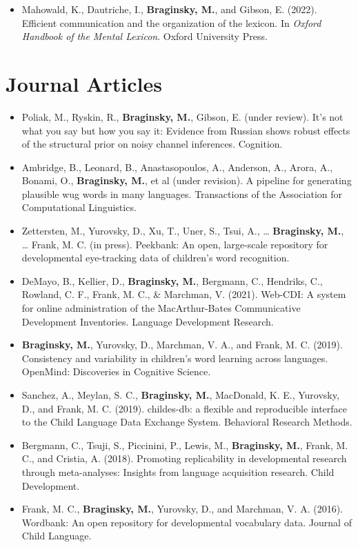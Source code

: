 \documentclass[11pt,]{article}
\providecommand{\tightlist}{%
  \setlength{\itemsep}{0pt}\setlength{\parskip}{0pt}}
\begin{document}
\begin{itemize}
\tightlist
\item
  Mahowald, K., Dautriche, I., \textbf{Braginsky, M.}, and Gibson, E.
  (2022). Efficient communication and the organization of the lexicon.
  In \emph{Oxford Handbook of the Mental Lexicon}. Oxford University
  Press.
\end{itemize}

\hypertarget{journal-articles}{%
\section{Journal Articles}\label{journal-articles}}

\begin{itemize}
\item
  Poliak, M., Ryskin, R., \textbf{Braginsky, M.}, Gibson, E. (under
  review). It's not what you say but how you say it: Evidence from
  Russian shows robust effects of the structural prior on noisy channel
  inferences. Cognition.
\item
  Ambridge, B., Leonard, B., Anastasopoulos, A., Anderson, A., Arora,
  A., Bonami, O., \textbf{Braginsky, M.}, et al (under revision). A
  pipeline for generating plausible wug words in many languages.
  Transactions of the Association for Computational Linguistics.
\item
  Zettersten, M., Yurovsky, D., Xu, T., Uner, S., Tsui, A., \ldots{}
  \textbf{Braginsky, M.}, \ldots{} Frank, M. C. (in press). Peekbank: An
  open, large-scale repository for developmental eye-tracking data of
  children's word recognition.
\item
  DeMayo, B., Kellier, D., \textbf{Braginsky, M.}, Bergmann, C.,
  Hendriks, C., Rowland, C. F., Frank, M. C., \& Marchman, V. (2021).
  Web-CDI: A system for online administration of the MacArthur-Bates
  Communicative Development Inventories. Language Development Research.
\item
  \textbf{Braginsky, M.}, Yurovsky, D., Marchman, V. A., and Frank, M.
  C. (2019). Consistency and variability in children's word learning
  across languages. OpenMind: Discoveries in Cognitive Science.
\item
  Sanchez, A., Meylan, S. C., \textbf{Braginsky, M.}, MacDonald, K. E.,
  Yurovsky, D., and Frank, M. C. (2019). childes-db: a flexible and
  reproducible interface to the Child Language Data Exchange System.
  Behavioral Research Methods.
\item
  Bergmann, C., Tsuji, S., Piccinini, P., Lewis, M., \textbf{Braginsky,
  M.}, Frank, M. C., and Cristia, A. (2018). Promoting replicability in
  developmental research through meta-analyses: Insights from language
  acquisition research. Child Development.
\item
  Frank, M. C., \textbf{Braginsky, M.}, Yurovsky, D., and Marchman, V.
  A. (2016). Wordbank: An open repository for developmental vocabulary
  data. Journal of Child Language.
\end{itemize}
\end{document}
